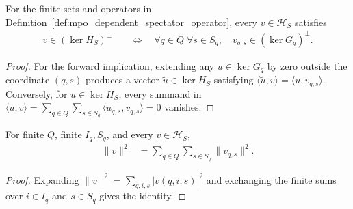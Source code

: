 \begin{lemma}
    \label{thm:mpo_dependent_spectator_orthogonal}
    \leanok
    For the finite sets and operators in
    Definition~\ref{def:mpo_dependent_spectator_operator}, every
    $v\in\mathcal H_S$ satisfies
    \begin{align}
        v\in(\ker H_S)^\perp
         & \quad\Longleftrightarrow\quad
        \forall q\in Q\;\forall s\in S_q,\quad v_{q,s}\in(\ker G_q)^\perp.
    \end{align}
\end{lemma}
\begin{proof}
    \leanok
    For the forward implication, extending any $u\in\ker G_q$ by zero
    outside the coordinate $(q,s)$ produces a vector
    $\widetilde u\in\ker H_S$ satisfying
    $\langle\widetilde u,v\rangle=\langle u,v_{q,s}\rangle$.
    Conversely, for $u\in\ker H_S$, every summand in
    $\langle u,v\rangle=\sum_{q\in Q}\sum_{s\in S_q}
        \langle u_{q,s},v_{q,s}\rangle=0$ vanishes.
\end{proof}

\begin{lemma}
    \label{thm:mpo_dependent_spectator_norm}
    \leanok
    For finite $Q$, finite $I_q,S_q$, and every $v\in\mathcal H_S$,
    \begin{align}
        \|v\|^2 & =\sum_{q\in Q}\sum_{s\in S_q}\|v_{q,s}\|^2.
        \label{eq:mpo_dependent_spectator_norm}
    \end{align}
\end{lemma}
\begin{proof}
    \leanok
    Expanding $\|v\|^2=\sum_{q,i,s}|v(q,i,s)|^2$ and exchanging the
    finite sums over $i\in I_q$ and $s\in S_q$ gives the identity.
\end{proof}

